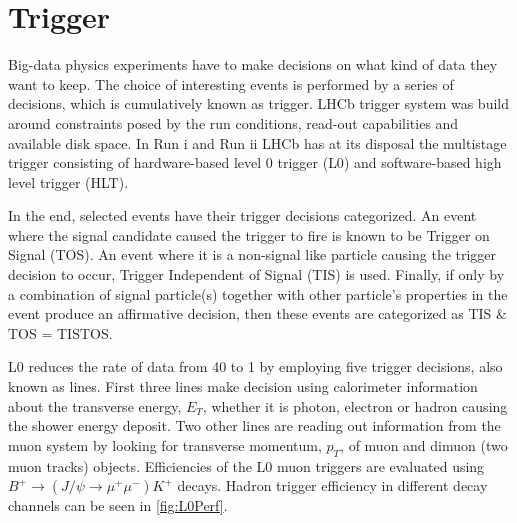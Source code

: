 \section{Trigger }
\label{triggerchap}
Big-data physics experiments have to make decisions on what kind of data they want to keep. The choice of interesting events is performed by a series of decisions, which is cumulatively known as trigger. \Gls{LHCb} trigger system was build around constraints posed by the run conditions, read-out capabilities and available disk space. In Run \Rn{1} and Run \Rn{2} \gls{LHCb} has at its disposal the multistage trigger consisting of hardware-based level 0 trigger (\Gls{L0}) and software-based high level trigger (\Gls{HLT}).

In the end, selected events have their trigger decisions categorized. An event where the signal candidate caused the trigger to fire is known to be Trigger on Signal (\Gls{TOS}). An event where it is a non-signal like particle causing the trigger decision to occur, Trigger Independent of Signal (\Gls{TIS}) is used. Finally, if only by a combination of signal particle(s) together with other particle's properties in the event produce an affirmative decision, then these events are categorized as \Gls{TIS} $\&$ \Gls{TOS} = \Gls{TISTOS}.

\Gls{L0} reduces the rate of data from 40 \mhz to 1 \mhz by employing five trigger decisions, also known as lines. First three lines make decision using calorimeter information about the transverse energy, $E_{T}$, whether it is photon, electron or hadron causing the shower energy deposit. Two other lines are reading out information from the muon system by looking for transverse momentum, $p_{T}$, of muon and dimuon (two muon tracks) objects. Efficiencies of the L0 muon triggers are evaluated using $B^{+} \rightarrow (J/\psi \rightarrow \mu^{+} \mu^{-}) K^{+}$ decays. Hadron trigger efficiency in different decay channels can be seen in \autoref{fig:L0Perf}. 



